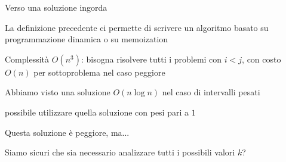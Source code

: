\begin{frame}{Verso una soluzione ingorda}

\vspace{-9pt}
\begin{myboxtitle}
\BI
\item La definizione precedente ci permette di scrivere un algoritmo basato su
programmazione dinamica o su memoization
\item Complessità $O(n^3)$: bisogna risolvere tutti i problemi con $i<j$, con
costo $O(n)$ per sottoproblema nel caso peggiore
\EI
\end{myboxtitle}

\begin{myboxtitle}
\BI
\item Abbiamo visto una soluzione $O(n \log n)$ nel caso di intervalli pesati
\item \EE possibile utilizzare quella soluzione con pesi pari a $1$
\item Questa soluzione è peggiore, ma...
\item Siamo sicuri che sia necessario analizzare tutti i possibili valori $k$? 
\EI
\end{myboxtitle}

\end{frame}

